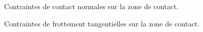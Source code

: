 \begin{figure}[ht!]
            \begin{center}
            \end{center}
            \caption{Contraintes de contact normales sur la zone de contact.}
            \label{cont_uniD}
\end{figure}


\begin{figure}[ht!]
            \begin{center}
            \end{center}
            \caption{Contraintes de frottement tangentielles sur la zone de contact.}
            \label{cont_froD}
\end{figure}

